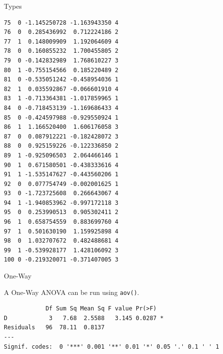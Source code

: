 \begin{frame}[fragile]{Types}
\begin{verbatim}
75  0 -1.145250728 -1.163943350 4
76  0  0.285436992  0.712224186 2
77  1  0.148009909  1.192064609 4
78  0  0.160855232  1.700455805 2
79  0 -0.142832989  1.768610227 3
80  1 -0.755154566  0.185220489 2
81  0 -0.535051242 -0.458954036 1
82  1  0.035592867 -0.066601910 4
83  1 -0.713364381 -1.017859965 1
84  0 -0.718453139 -1.169686433 4
85  0 -0.424597988 -0.929550924 1
86  1  1.166520400  1.606176058 3
87  0  0.087912221 -0.182428072 3
88  0  0.925159226 -0.122336850 2
89  1 -0.925096503  2.064466146 1
90  1  0.671580501 -0.438333616 4
91  1 -1.535147627 -0.443560206 1
92  0  0.077754749 -0.002001625 1
93  0 -1.723725608  0.266643067 4
94  1 -1.940853962 -0.997172118 3
95  0  0.253990513  0.905302411 2
96  1  0.658754559  0.883699760 4
97  1  0.501630190  1.159925898 4
98  0  1.032707672  0.482488681 4
99  1 -0.539928177  1.428106092 3
100 0 -0.219320071 -0.371407005 3
\end{verbatim}

\end{frame}

\begin{frame}[fragile]{One-Way}

A One-Way ANOVA can be run using \texttt{aov()}.

\begin{Shaded}
\begin{Highlighting}[]
\StringTok{ }\OperatorTok{~}\StringTok{ }
\end{Highlighting}
\end{Shaded}

\begin{verbatim}
            Df Sum Sq Mean Sq F value Pr(>F)  
D            3   7.68  2.5588   3.145 0.0287 *
Residuals   96  78.11  0.8137                 
---
Signif. codes:  0 '***' 0.001 '**' 0.01 '*' 0.05 '.' 0.1 ' ' 1
\end{verbatim}

\end{frame}

